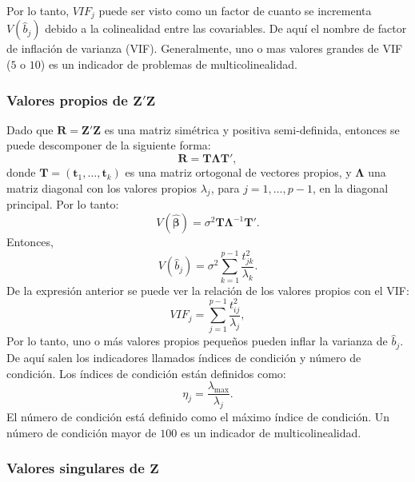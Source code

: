 \documentclass[
]{article}
\begin{document}
Por lo tanto, \(VIF_j\) puede ser visto como un factor de cuanto se incrementa \(V(\widehat{b}_{j})\) debido a la colinealidad entre las covariables. De aquí el nombre de factor de inflación de varianza (VIF). Generalmente, uno o mas valores grandes de VIF (\(5\) o \(10\)) es un indicador de problemas de multicolinealidad.

\subsubsection{\texorpdfstring{Valores propios de \(\boldsymbol Z'\boldsymbol Z\)}{Valores propios de \textbackslash boldsymbol Z\textquotesingle\textbackslash boldsymbol Z}}\label{valores-propios-de-boldsymbol-zboldsymbol-z}

Dado que \(\boldsymbol R= \boldsymbol Z'\boldsymbol Z\) es una matriz simétrica y positiva semi-definida, entonces se puede descomponer de la siguiente forma:
\[
\boldsymbol R= \boldsymbol T\boldsymbol \Lambda\boldsymbol T',
\]
donde \(\boldsymbol T= (\boldsymbol t_{1},\ldots,\boldsymbol t_{k})\) es una matriz ortogonal de vectores propios, y \(\boldsymbol \Lambda\) una matriz diagonal con los valores propios \(\lambda_{j}\), para \(j=1,\ldots,p-1\), en la diagonal principal. Por lo tanto:
\[
V(\widehat{\boldsymbol \beta}) = \sigma^{2}\boldsymbol T\boldsymbol \Lambda^{-1}\boldsymbol T'.
\]
Entonces,
\[
V(\widehat{b}_{j}) = \sigma^{2}\sum_{k=1}^{p-1}\frac{t_{jk}^{2}}{\lambda_{k}}.
\]
De la expresión anterior se puede ver la relación de los valores propios con el VIF:
\[
VIF_{j} = \sum_{j=1}^{p-1}\frac{t_{ij}^{2}}{\lambda_{j}},
\]
Por lo tanto, uno o más valores propios pequeños pueden inflar la varianza de \(\widehat{b}_{j}\). De aquí salen los indicadores llamados índices de condición y número de condición. Los índices de condición están definidos como:
\[
\eta_{j} = \frac{\lambda_{\mbox{max}}}{\lambda_{j}}.
\]
El número de condición está definido como el máximo índice de condición. Un número de condición mayor de \(100\) es un indicador de multicolinealidad.

\subsubsection{\texorpdfstring{Valores singulares de \(\boldsymbol Z\)}{Valores singulares de \textbackslash boldsymbol Z}}\label{valores-singulares-de-boldsymbol-z}
\end{document}
